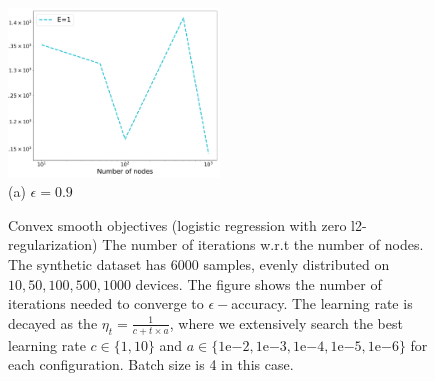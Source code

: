 \begin{figure}
\centering
\includegraphics[width=0.5\textwidth]{fig/synthetic_logistic_regression_small-epsilon09-logTrue-epoch-1-b4-regularization0.pdf} \\ 
(a) $\epsilon=0.9$ \\
\caption{Convex smooth objectives (logistic regression with zero l2-regularization) The number of iterations w.r.t the number of nodes. The synthetic dataset has $6000$ samples, evenly distributed on $10, 50, 100, 500, 1000$ devices. The figure shows the number of iterations needed to converge to $\epsilon-$accuracy. The learning rate is decayed as the $\eta_t = \frac{1}{c + t \times a}$, where we extensively search the best learning rate $c \in \{1, 10\}$ and $a \in \{1\mathrm{e}{-2}, 1\mathrm{e}{-3}, 1\mathrm{e}{-4}, 1\mathrm{e}{-5}, 1\mathrm{e}{-6}\}$ for each configuration. Batch size is 4 in this case.}
\end{figure}




